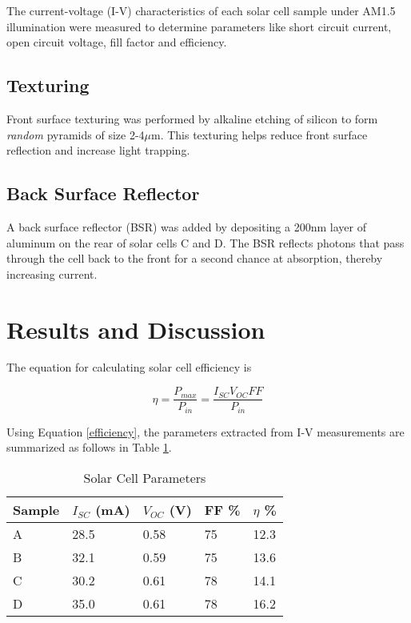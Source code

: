\documentclass[zh-cn]{report}
\begin{document}
The current-voltage (I-V) characteristics of each solar cell sample under AM1.5 illumination were measured to determine parameters like short circuit current, open circuit voltage, fill factor and efficiency.

\subsection{Texturing}
Front surface texturing was performed by alkaline etching of silicon to form \emph{random} pyramids of size 2-4$\mu$m. This texturing helps reduce front surface reflection and increase light trapping.

\subsection{Back Surface Reflector}
A back surface reflector (BSR) was added by depositing a 200nm layer of aluminum on the rear of solar cells C and D. The BSR reflects photons that pass through the cell back to the front for a second chance at absorption, thereby increasing current.

\section{Results and Discussion}
The equation for calculating solar cell efficiency is 

\begin{equation}
    \label{efficiency}
    \eta = \frac{P_{max}}{P_{in}} = \frac{I_{SC}V_{OC}FF}{P_{in}}
\end{equation}

Using Equation \ref{efficiency}, the parameters extracted from I-V measurements are summarized as follows in Table \ref{parameters}. 

\begin{table}[h]
    \caption{Solar Cell Parameters}
    \label{parameters}
    \centering
    \begin{tabularx}{\linewidth}{lXXXX}
        \toprule
        Sample & $I_{SC}$ (mA) & $V_{OC}$ (V) & FF \% & $\eta$ \% \\
        \midrule
        A & 28.5 & 0.58 & 75 & 12.3 \\
        B & 32.1 & 0.59 & 75 & 13.6 \\
        C & 30.2 & 0.61 & 78 & 14.1 \\
        D & 35.0 & 0.61 & 78 & 16.2 \\
        \bottomrule
    \end{tabularx}
\end{table}
\end{document}
